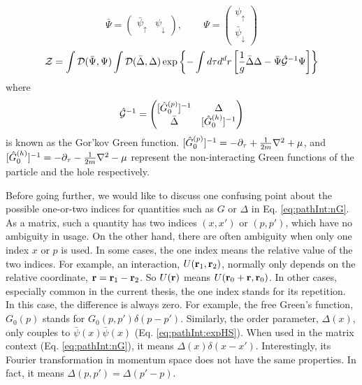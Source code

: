 \begin{equation}
\bar\Psi=\begin{pmatrix}\bar{\psi}_{\uparrow}&\psi_{\downarrow}\end{pmatrix}\text{,  }\qquad
\Psi=\begin{pmatrix}{\psi}_{\uparrow}\\\bar\psi_{\downarrow}\end{pmatrix}
\end{equation}
\begin{equation}\label{eq:pathInt:ZDeltaPhi}
\mathcal{Z}=\int{\ensuremath{\mathcal{D}}(\bar\Psi,\Psi)}\int{\ensuremath{\mathcal{D}}(\bar\Delta,\Delta)}\exp
	\left\{-\int{d\tau{d^{d}r}}\left[\frac{1}{g}{\bar\Delta}{\Delta}-\bar\Psi \hat{\mathcal{G}}^{-1}\Psi\right]\right\}
\end{equation}
where 
\begin{equation}\label{eq:pathInt:nG}
\hat{\mathcal{G}}^{-1}=\begin{pmatrix}
[\hat{G}_{0}^{(p)}]^{-1}&\Delta\\\bar\Delta&[\hat{G}_{0}^{(h)}]^{-1}
\end{pmatrix}
\end{equation}
is known as the Gor'kov Green function. $[\hat{G}_{0}^{(p)}]^{-1}=-\partial_{\tau}+\frac{1}{2m}\nabla^{2}+\mu$, and $[\hat{G}_{0}^{(h)}]^{-1}=-\partial_{\tau}-\frac{1}{2m}\nabla^{2}-\mu$ represent the non-interacting Green functions of the particle and the hole respectively. 

Before going further, we would like to discuss one confusing point about the possible one-or-two indices for quantities such as ${G}$ or $\Delta$ in Eq. \ref{eq:pathInt:nG}.  As a matrix, such a quantity has two indices $(x,x')$ or $(p,p')$, which have no ambiguity in usage. On the other hand, there are often ambiguity when only one index $x$ or $p$ is used. In some cases, the one index means the relative value of the two indices. For example, an  interaction, $U(\mathbf{r}_{1},\mathbf{r}_{2})$, normally only depends on the relative coordinate, $\mathbf{r}=\mathbf{r}_{1}-\mathbf{r}_{2}$. So $U(\mathbf{r})$ means $U(\mathbf{r}_{0}+\mathbf{r},\mathbf{r}_{0})$.  In other cases, especially common in the current thesis, the one index stands for its repetition.  In this case, the difference is always zero. For example, the free Green's function, $G_{0}(p)$ stands for $G_{0}(p,p')\delta({p-p'})$.  Similarly,  the order parameter, $\Delta(x)$, only couples to $\bar\psi(x)\bar\psi(x)$ (Eq. \ref{eq:pathInt:expHS}).  When used in the matrix context (Eq. \ref{eq:pathInt:nG}), it means $\Delta(x)\delta(x-x')$. Interestingly, its Fourier transformation in momentum space does not have the same properties.  In fact, it means $\Delta(p,p')=\Delta(p'-p)$.

